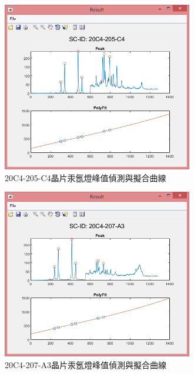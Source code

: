 \begin{figure}[H] %
	\centering %
	\vspace{0.8cm}
	\includegraphics[width=0.74\textwidth]{figures/Result/比較/C4.jpg} %
	\caption{20C4-205-C4晶片汞氬燈峰值偵測與擬合曲線} %
	\label{C4汞氬燈峰值偵測與擬合曲線} %
\end{figure}
\begin{figure}[H] %
	\centering %
	\vspace{0.8cm}
	\includegraphics[width=0.74\textwidth]{figures/Result/比較/A3.jpg} %
	\caption{20C4-207-A3晶片汞氬燈峰值偵測與擬合曲線} %
	\label{A3汞氬燈峰值偵測與擬合曲線} %
\end{figure}
